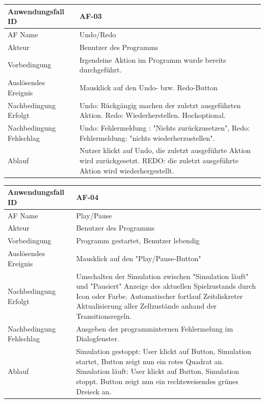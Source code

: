 \documentclass[11pt,a4paper]{article}
\begin{document}
\begin{tabular}[m]{|m{7cm}|m{9cm}|}
    \hline
    Anwendungsfall ID     & AF-03  \\
         \hline
    AF Name     &  Undo/Redo \\
         \hline
    Akteur&Benutzer des Programms \\
    \hline
    Vorbedingung&Irgendeine Aktion im Programm wurde bereits durchgeführt.\\
    \hline
    Auslösendes Ereignis&Mausklick auf den Undo- bzw. Redo-Button\\
    \hline
    Nachbedingung Erfolgt&Undo: Rückgängig machen der zuletzt ausgeführten Aktion. Redo: Wiederherstellen. Hochoptional.\\
    \hline
    Nachbedingung Fehlschlag&Undo: Fehlermeldung : "Nichts zurückzusetzen", Redo: Fehlermeldung: "nichts wiederherzustellen".\\
    \hline
    Ablauf&Nutzer klickt auf Undo, die zuletzt ausgeführte Aktion wird zurückgesetzt. REDO: die zuletzt ausgeführte Aktion wird wiederhergestellt.\\
    \hline
\end{tabular}
\par


\begin{tabular}[m]{|m{7cm}|m{9cm}|}
    \hline
    Anwendungsfall ID     & AF-04 \\
         \hline
    AF Name     &  Play/Pause \\
         \hline
    Akteur&Benutzer des Programms \\
    \hline
    Vorbedingung&Programm gestartet, Benutzer lebendig\\
    \hline
    Auslösendes Ereignis&Mausklick auf den "Play/Pause-Button"\\
    \hline
    Nachbedingung Erfolgt&Umschalten der Simulation zwischen "Simulation läuft" und "Pausiert" Anzeige des aktuellen Spielzustands durch Icon oder Farbe. Automatischer fortlauf Zeitdiskreter Aktualisierung aller Zellzustände anhand der Transitionsregeln.\\
    \hline
    Nachbedingung Fehlschlag&Ausgeben der programminternen Fehlermelung im Dialogfenster.\\
    \hline
    Ablauf&Simulation gestoppt: User klickt auf Button, Simulation startet, Button zeigt nun ein rotes Quadrat an. Simulation läuft: User klickt auf Button, Simulation stoppt. Button zeigt nun ein rechtsweisendes grünes Dreieck an.\\
    \hline
\end{tabular}
\par
\end{document}
